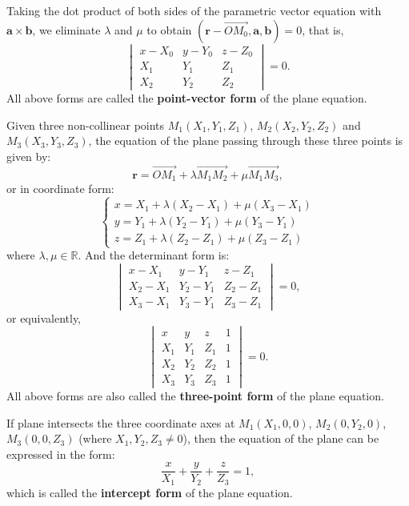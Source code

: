 \documentclass[11pt]{../../TexTemplate/elegantbook} %
\begin{document}
Taking the dot product of both sides of the parametric vector equation with \(\mathbf{a} \times \mathbf{b}\), 
we eliminate \(\lambda\) and \(\mu\) to obtain \((\mathbf{r} - \vec{OM_{0}}, \mathbf{a}, \mathbf{b}) = 0\), that is,
\begin{equation}\label{eq:PlaneDeterminantForm}
    \begin{vmatrix}
        x - X_{0} & y - Y_{0} & z - Z_{0} \\
        X_{1} & Y_{1} & Z_{1} \\
        X_{2} & Y_{2} & Z_{2}
    \end{vmatrix} = 0.
\end{equation}
All above forms are called the \textbf{point-vector form} of the plane equation.
\vspace{0.7cm}

Given three non-collinear points \(M_{1}(X_{1}, Y_{1}, Z_{1})\), \(M_{2}(X_{2}, Y_{2}, Z_{2})\) and \(M_{3}(X_{3}, Y_{3}, Z_{3})\),
the equation of the plane passing through these three points is given by:
\[
\mathbf{r} = \vec{OM_{1}} + \lambda \vec{M_{1}M_{2}} + \mu \vec{M_{1}M_{3}},
\]
or in coordinate form:
\[
\begin{cases}
x = X_{1} + \lambda (X_{2} - X_{1}) + \mu (X_{3} - X_{1}) \\
y = Y_{1} + \lambda (Y_{2} - Y_{1}) + \mu (Y_{3} - Y_{1}) \\
z = Z_{1} + \lambda (Z_{2} - Z_{1}) + \mu (Z_{3} - Z_{1})
\end{cases}
\]
where \(\lambda, \mu \in \mathbb{R}\).
And the determinant form is:
\[
\begin{vmatrix}
x - X_{1} & y - Y_{1} & z - Z_{1} \\
X_{2} - X_{1} & Y_{2} - Y_{1} & Z_{2} - Z_{1} \\
X_{3} - X_{1} & Y_{3} - Y_{1} & Z_{3} - Z_{1}
\end{vmatrix} = 0,
\]
or equivalently,
\[
\begin{vmatrix}
x & y & z & 1 \\
X_{1} & Y_{1} & Z_{1} & 1 \\
X_{2} & Y_{2} & Z_{2} & 1 \\
X_{3} & Y_{3} & Z_{3} & 1
\end{vmatrix} = 0.
\]
All above forms are also called the \textbf{three-point form} of the plane equation.

If plane intersects the three coordinate axes at 
\(M_{1}(X_{1}, 0, 0)\), \(M_{2}(0, Y_{2}, 0)\), \(M_{3}(0, 0, Z_{3})\) (where \(X_{1}, Y_{2}, Z_{3} \neq 0\)), 
then the equation of the plane can be expressed in the form:
\[
\frac{x}{X_{1}} + \frac{y}{Y_{2}} + \frac{z}{Z_{3}} = 1,
\]
which is called the \textbf{intercept form} of the plane equation.
\end{document}
